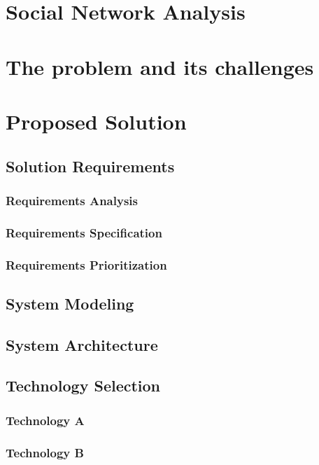\documentclass[
  oneside,
  11pt, a4paper,
  footinclude=true,
  headinclude=true,
  cleardoublepage=empty
]{scrbook}
\begin{document}
	
	\chapter{Social Network Analysis}
	


	\chapter{The problem and its challenges}


	\chapter{Proposed Solution}
	\section{Solution Requirements}
	\subsection{Requirements Analysis}
	\subsection{Requirements Specification}
	\subsection{Requirements Prioritization}
	\section{System Modeling}
	\section{System Architecture}
	\section{Technology Selection}
	\subsection{Technology A}
	\subsection{Technology B}
\end{document}
